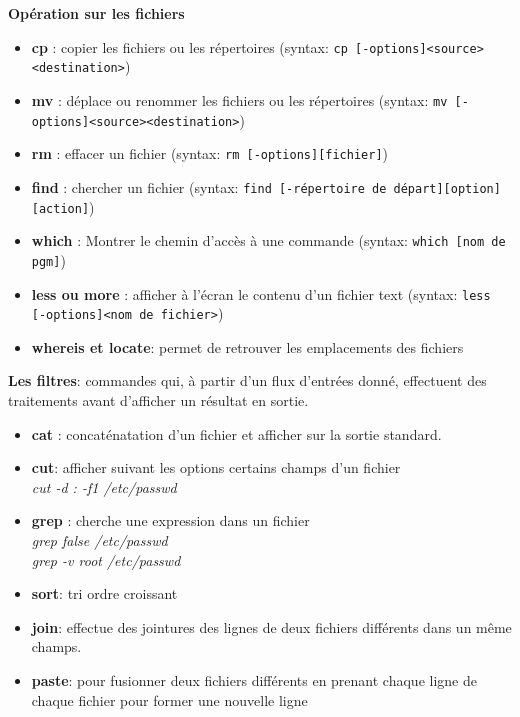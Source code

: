 \documentclass[french]{beamer}
\begin{document}
\begin{frame}
\textbf{Opération sur les fichiers}
    \begin{itemize}
    \item \textbf{cp} : copier les fichiers ou les répertoires (syntax: \texttt{cp [-options]<source><destination>})
    \item \textbf{mv} : déplace ou renommer les fichiers ou les répertoires (syntax: \texttt{mv [-options]<source><destination>})
    \item \textbf{rm} : effacer un fichier (syntax: \texttt{rm [-options][fichier]})
    \item \textbf{find} : chercher un fichier (syntax: \texttt{find [-répertoire de départ][option][action]})
    \item \textbf{which} : Montrer le chemin d'accès à une commande (syntax: \texttt{which [nom de pgm]})
    \item \textbf{less ou more} : afficher à l'écran le contenu d'un fichier text (syntax: \texttt{less [-options]<nom de fichier>})
    \item \textbf{whereis et locate}: permet de retrouver les emplacements des fichiers
    \end{itemize}
\end{frame}

\begin{frame}
\textbf{Les filtres}: commandes qui, à partir d'un flux d'entrées donné,
effectuent des traitements avant d'afficher un résultat en sortie.
    \begin{itemize}
    \item \textbf{cat} : concaténatation d'un fichier et afficher sur la sortie
    standard. \\
    \item \textbf{cut}: afficher suivant les options certains champs d'un
    fichier \\
    \textit{cut -d : -f1 /etc/passwd}
    \item \textbf{grep} : cherche une expression dans un fichier \\
    \textit{grep false /etc/passwd} \\
    \textit{grep -v root /etc/passwd} \\
    \item \textbf{sort}: tri ordre croissant
    \item \textbf{join}: effectue des jointures des lignes de deux fichiers
    différents dans un même champs. 
    \item \textbf{paste}: pour fusionner deux fichiers différents en prenant
    chaque ligne de chaque fichier pour former une nouvelle ligne
    \end{itemize}
\end{frame}
\end{document}
